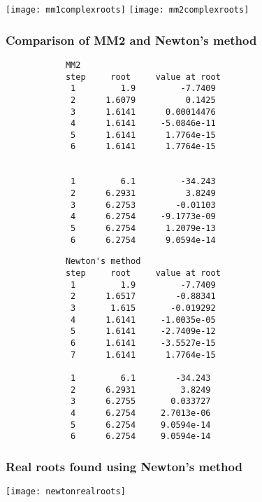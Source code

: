 \documentclass{article}
\begin{document}
	\texttt{[image: mm1complexroots]}
	\texttt{[image: mm2complexroots]}
	
	\newpage
	\subsubsection{Comparison of MM2 and Newton's method}
	
		\begin{multicols}{2}
		\begin{verbatim}
			MM2
			step     root     value at root
			 1         1.9         -7.7409 
			 2      1.6079          0.1425 
			 3      1.6141      0.00014476 
			 4      1.6141     -5.0846e-11 
			 5      1.6141      1.7764e-15 
			 6      1.6141      1.7764e-15 
			 

			 1         6.1         -34.243 
			 2      6.2931          3.8249 
			 3      6.2753        -0.01103 
			 4      6.2754     -9.1773e-09 
			 5      6.2754      1.2079e-13 
			 6      6.2754      9.0594e-14 
		\end{verbatim}
		\begin{verbatim}
			Newton's method
			step     root     value at root
			 1         1.9         -7.7409 
			 2      1.6517        -0.88341 
			 3       1.615       -0.019292 
			 4      1.6141     -1.0035e-05 
			 5      1.6141     -2.7409e-12 
			 6      1.6141     -3.5527e-15 
			 7      1.6141      1.7764e-15 
			 
			 1         6.1        -34.243  
			 2      6.2931         3.8249  
			 3      6.2755       0.033727  
			 4      6.2754     2.7013e-06  
			 5      6.2754     9.0594e-14  
			 6      6.2754     9.0594e-14  
		\end{verbatim}
	\end{multicols}
	
	\subsubsection{Real roots found using Newton's method}
	
	\texttt{[image: newtonrealroots]}
	
\end{document}
